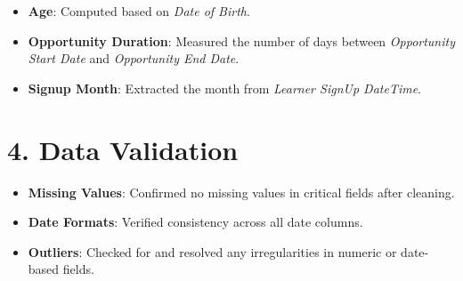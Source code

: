 \documentclass[12pt,a4paper]{article}
\begin{document}
\begin{itemize}
\item \textbf{Age}: Computed based on \textit{Date of Birth}.
\item \textbf{Opportunity Duration}: Measured the number of days between \textit{Opportunity Start Date} and \textit{Opportunity End Date}.
\item \textbf{Signup Month}: Extracted the month from \textit{Learner SignUp DateTime}.
\end{itemize}

\section*{4. Data Validation}

\begin{itemize}
\item \textbf{Missing Values}: Confirmed no missing values in critical fields after cleaning.
\item \textbf{Date Formats}: Verified consistency across all date columns.
\item \textbf{Outliers}: Checked for and resolved any irregularities in numeric or date-based fields.
\end{itemize}
\end{document}
